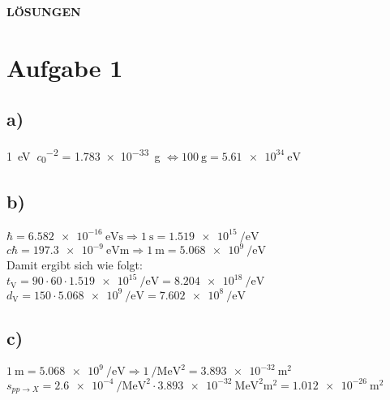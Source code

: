 \documentclass{scrartcl}
\begin{document}



\begin{center}
  \begin{huge}
    \textbf{LÖSUNGEN}
  \end{huge}
\end{center}


\section*{Aufgabe 1}

\subsection*{a)}
\SI{1}{\electronvolt\per\clight\squared} = \SI{1.783e-33}{\gram} $\Longleftrightarrow \SI{100}{\gram} = \SI{5.61e34}{\electronvolt}$

\subsection*{b)}
$\hbar = \SI{6.582e-16}{\electronvolt\second} \Rightarrow \SI{1}{\second} = \SI{1.519e15}{\per\electronvolt}$ \\
$c\hbar = \SI{197.3e-9}{\electronvolt\meter} \Rightarrow \SI{1}{\meter} = \SI{5.068e9}{\per\electronvolt}$ \\

Damit ergibt sich wie folgt: \\

$t_\text{V} = 90\cdot60\cdot\SI{1.519e15}{\per\electronvolt} = \SI{8.204e18}{\per\electronvolt}$ \\
$d_\text{V} = 150\cdot\SI{5.068e9}{\per\electronvolt} = \SI{7.602e8}{\per\electronvolt}$

\subsection*{c)}

$\SI{1}{\meter} = \SI{5.068e9}{\per\electronvolt} \Rightarrow \SI{1}{\per\mega\electronvolt\squared} = \SI{3.893e-32}{\meter\squared}$ \\
$s_{pp\rightarrow X} = \SI{2.6e-4}{\per\mega\electronvolt\squared} \cdot \SI{3.893e-32}{\mega\electronvolt\squared\meter\squared} = \SI{1.012e-26}{\meter\squared}$
\end{document}
